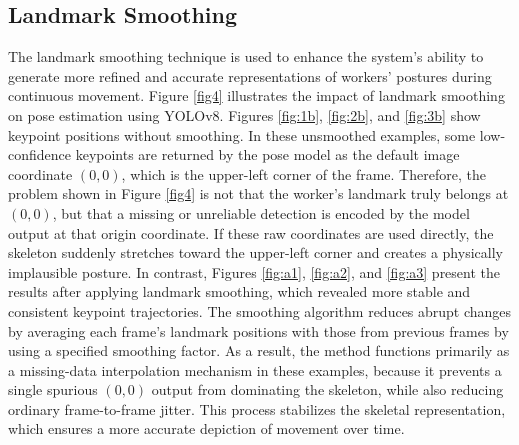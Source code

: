 \documentclass[11pt]{article}
\begin{document}

\subsection{Landmark Smoothing}

The landmark smoothing technique is used to enhance the system's ability to generate more refined and accurate representations of workers' postures during continuous movement. Figure \ref{fig4} illustrates the impact of landmark smoothing on pose estimation using YOLOv8. Figures \ref{fig:1b}, \ref{fig:2b}, and \ref{fig:3b} show keypoint positions without smoothing. In these unsmoothed examples, some low-confidence keypoints are returned by the pose model as the default image coordinate \((0,0)\), which is the upper-left corner of the frame. Therefore, the problem shown in Figure \ref{fig4} is not that the worker's landmark truly belongs at \((0,0)\), but that a missing or unreliable detection is encoded by the model output at that origin coordinate. If these raw coordinates are used directly, the skeleton suddenly stretches toward the upper-left corner and creates a physically implausible posture. In contrast, Figures \ref{fig:a1}, \ref{fig:a2}, and \ref{fig:a3} present the results after applying landmark smoothing, which revealed more stable and consistent keypoint trajectories. The smoothing algorithm reduces abrupt changes by averaging each frame's landmark positions with those from previous frames by using a specified smoothing factor. As a result, the method functions primarily as a missing-data interpolation mechanism in these examples, because it prevents a single spurious \((0,0)\) output from dominating the skeleton, while also reducing ordinary frame-to-frame jitter. This process stabilizes the skeletal representation, which ensures a more accurate depiction of movement over time.
\end{document}
